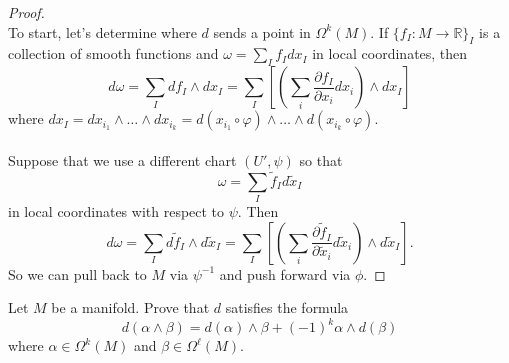 \documentclass{article}
\newenvironment{problem}[2][Problem]{\begin{trivlist}
\item[\hskip \labelsep {\bfseries #1}\hskip \labelsep {\bfseries #2.}]}{\end{trivlist}}
\begin{document}
\begin{proof} \text{}\\
  To start, let's determine where $d$ sends a point in $\Omega^k(M)$.
  If $\{f_I\colon M \rightarrow \mathbb{R}\}_I$ is a collection of
  smooth functions and $\omega = \sum_I f_Idx_I$ in local coordinates,
  then \[
    d\omega = \sum_I df_I \wedge dx_I = \sum_I \left[\left(\sum_i \frac{\partial f_I}{\partial x_i} dx_i \right) \wedge dx_I\right]
  \] where
  $dx_I = dx_{i_1} \wedge\hdots\wedge dx_{i_k} = d(x_{i_1} \circ \varphi) \wedge\hdots\wedge d(x_{i_k} \circ \varphi)$.
  \\~\\
  Suppose that we use a different chart $(U', \psi)$ so that \[
    \omega = \sum_I \tilde{f}_Id\tilde{x}_I
  \] in local coordinates with respect to $\psi$. Then \[
    d\omega
    = \sum_I d\tilde{f}_I \wedge d\tilde{x}_I
    = \sum_I \left[\left(\sum_i \frac{\partial \tilde{f}_I}{\partial \tilde{x}_i} d\tilde{x}_i \right) \wedge d\tilde{x}_I\right].
  \]
  So we can pull back to $M$ via $\psi^{-1}$ and push forward via $\phi$.
\end{proof}

\pagebreak

\begin{problem}{5}
  Let $M$ be a manifold. Prove that $d$ satisfies the formula \[
    d(\alpha\wedge\beta) = d(\alpha)\wedge\beta + (-1)^k\alpha\wedge d(\beta)
  \] where $\alpha \in \Omega^k(M)$ and $\beta \in \Omega^\ell(M)$.
\end{problem}
\end{document}
